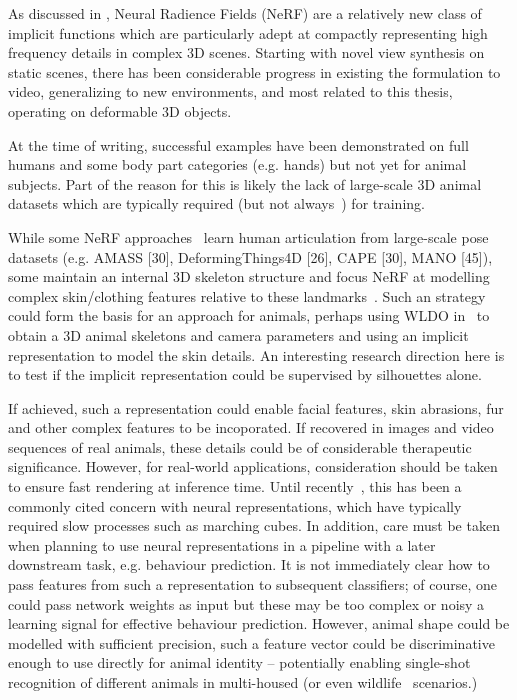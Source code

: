 As discussed in , Neural Radience Fields (NeRF) are a relatively new class of implicit functions which are particularly adept at compactly representing high frequency details in complex 3D scenes. Starting with novel view synthesis on static scenes, there has been considerable progress in existing the formulation to video, generalizing to new environments, and most related to this thesis, operating on deformable 3D objects. 

At the time of writing, successful examples have been demonstrated on full humans and some body part categories (e.g. hands) but not yet for animal subjects. Part of the reason for this is likely the lack of large-scale 3D animal datasets which are typically required (but not always~\cite{xxx}) for training. 


While some NeRF approaches~ learn human articulation from large-scale pose datasets (e.g. AMASS [30], DeformingThings4D [26], CAPE [30], MANO [45]), some maintain an internal 3D skeleton structure and focus NeRF at modelling complex skin/clothing features relative to these landmarks~. Such an strategy could form the basis for an approach for animals, perhaps using WLDO in~ to obtain a 3D animal skeletons and camera parameters and using an implicit representation to model the skin details. An interesting research direction here is to test if the implicit representation could be supervised by silhouettes alone.

If achieved, such a representation could enable facial features, skin abrasions, fur and other complex features to be incoporated. If recovered in images and video sequences of real animals, these details could be of considerable therapeutic significance. However, for real-world applications, consideration should be taken to ensure fast rendering at inference time. Until recently~\cite{xxx}, this has been a commonly cited concern with neural representations, which have typically required slow processes such as marching cubes. In addition, care must be taken when planning to use neural representations in a pipeline with a later downstream task, e.g. behaviour prediction. It is not immediately clear how to pass features from such a representation to subsequent classifiers; of course, one could pass network weights as input but these may be too complex or noisy a learning signal for effective behaviour prediction. However, animal shape could be modelled with sufficient precision, such a feature vector could be discriminative enough to use directly for animal identity -- potentially enabling single-shot recognition of different animals in multi-housed (or even wildlife~ scenarios.)

